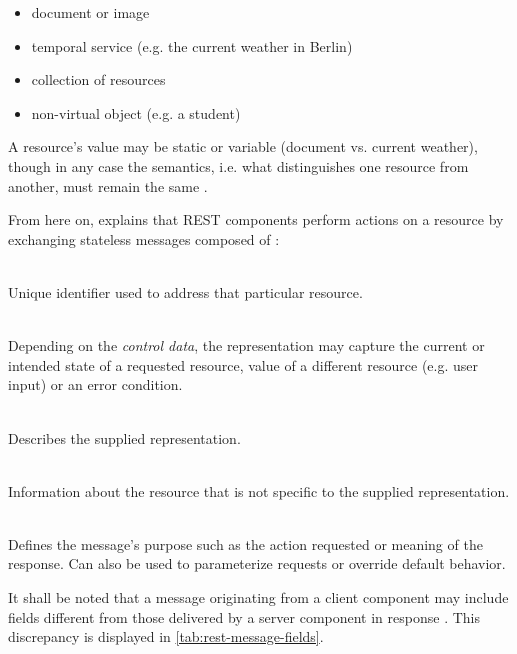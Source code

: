 \begin{appendices}
\begin{itemize}
  \item document or image
  \item temporal service (e.g. the current weather in Berlin)
  \item collection of resources
  \item non-virtual object (e.g. a student)
\end{itemize}

A resource's value may be static or variable (document vs. current weather), though in any case the semantics, i.e. what distinguishes one resource from another, must remain the same \cite[p.~89]{fielding2000architectural}.

From here on, \citeauthor{fielding2000architectural} explains that \ac{REST} components perform actions on a resource by exchanging stateless messages composed of \cite[pp.~90--91]{fielding2000architectural}:

\begin{description}[format={\storedescriptionlabel}]
	\item[Resource identifier]
	\hfill \\
	Unique identifier used to address that particular resource.
	\item[Representation]
	\hfill \\
	Depending on the \textit{control data}, the representation may capture the current or intended state of a requested resource, value of a different resource (e.g. user input) or an error condition.
	\item[Representation metadata]
	\hfill \\
	Describes the supplied representation.
	\item[Resource metadata]
	\hfill \\
	Information about the resource that is not specific to the supplied representation.
	\item[Control data]
	\hfill \\
	Defines the message's purpose such as the action requested or meaning of the response. Can also be used to parameterize requests or override default behavior.
\end{description}

It shall be noted that a message originating from a client component may include fields different from those delivered by a server component in response \cite[pp.~93--94]{fielding2000architectural}. This discrepancy is displayed in \autoref{tab:rest-message-fields}.


\end{appendices}
